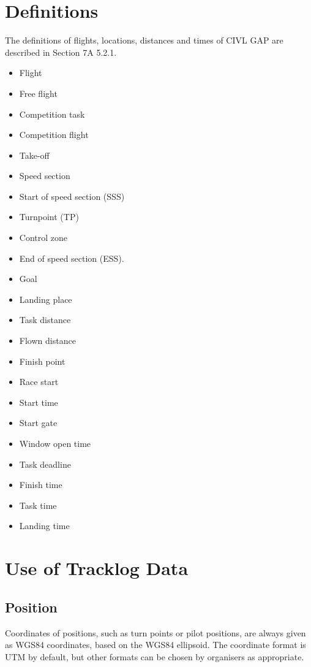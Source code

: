 \documentclass{article}
\begin{document}
\newpage
\section{Definitions}
The definitions of flights, locations, distances and times of CIVL GAP are
described in Section 7A 5.2.1.
\begin{itemize}
    \item Flight
    \item Free flight
    \item Competition task
    \item Competition flight
    \item Take-off
    \item Speed section
    \item Start of speed section (SSS)
    \item Turnpoint (TP)
    \item Control zone
    \item End of speed section (ESS).
    \item Goal
    \item Landing place
    \item Task distance
    \item Flown distance
    \item Finish point
    \item Race start
    \item Start time
    \item Start gate
    \item Window open time
    \item Task deadline
    \item Finish time
    \item Task time
    \item Landing time
\end{itemize}

\newpage
\section{Use of Tracklog Data}
\label{sec:use-of-tracklog-data}
\subsection{Position}
Coordinates of positions, such as turn points or pilot positions, are always
given as WGS84 coordinates, based on the WGS84 ellipsoid. The coordinate format
is UTM by default, but other formats can be chosen by organisers as
appropriate.
\end{document}
